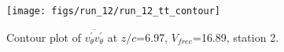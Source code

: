 \begin{figure}[H]
\centering
\texttt{[image: figs/run\_12/run\_12\_tt\_contour]}
\caption{Contour plot of $\overline{v_{\theta}^{\prime} v_{\theta}^{\prime}}$ at $z/c$=6.97, $V_{free}$=16.89, station 2.}
\label{fig:run_12_tt_contour}
\end{figure}



